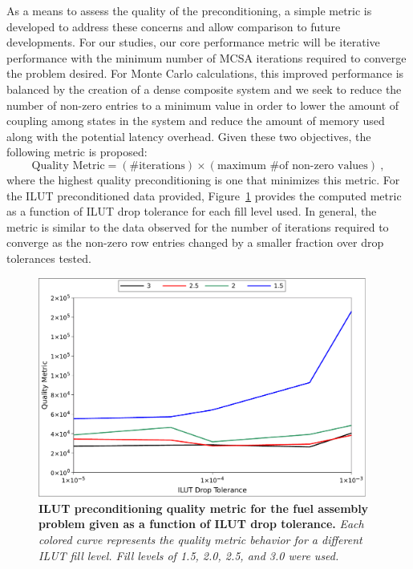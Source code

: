 As a means to assess the quality of the preconditioning, a simple
metric is developed to address these concerns and allow comparison to
future developments. For our studies, our core performance metric will
be iterative performance with the minimum number of MCSA iterations
required to converge the problem desired. For Monte Carlo
calculations, this improved performance is balanced by the creation of
a dense composite system and we seek to reduce the number of non-zero
entries to a minimum value in order to lower the amount of coupling
among states in the system and reduce the amount of memory used
along with the potential latency overhead. Given these two objectives,
the following metric is proposed:
\begin{equation}
  \text{Quality Metric} = (\text{\# iterations}) \times (\text{maximum
    \# of non-zero values})\:,
\end{equation}
where the highest quality preconditioning is one that minimizes this
metric. For the ILUT preconditioned data provided,
Figure~\ref{fig:ilut_quality} provides the computed metric as a
function of ILUT drop tolerance for each fill level used. In general,
the metric is similar to the data observed for the number of
iterations required to converge as the non-zero row entries changed by
a smaller fraction over drop tolerances tested.
\begin{figure}[t!]
  \begin{center}
    \includegraphics[width=4.25in]{chapters/spn_equations/ilut_quality.pdf}
  \end{center}
  \caption{\textbf{ILUT preconditioning quality metric for the fuel
      assembly problem given as a function of ILUT drop tolerance.}
    \textit{Each colored curve represents the quality metric behavior
      for a different ILUT fill level. Fill levels of 1.5, 2.0, 2.5,
      and 3.0 were used.}}
  \label{fig:ilut_quality}
\end{figure}

